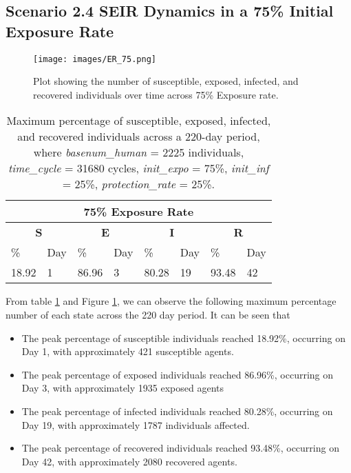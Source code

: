 \subsection{ Scenario 2.4 SEIR Dynamics in a 75\% Initial Exposure Rate}
\begin{figure}[H]
	\centering
	\texttt{[image: images/ER\_75.png]}
	\caption{Plot showing the number of susceptible, exposed, infected, and recovered individuals over time across 75\% Exposure rate. }
	\label{fig:20} 
\end{figure}
\begin{table} [H]
	\centering
	\begin{tabular}{|l|l|l|l|l|l|l|l|}
		\hline
		\multicolumn{8}{|c|}{\textbf{75\% Exposure Rate}}\\
		\hline
		\multicolumn{2}{|c|}{\textbf{S}} &  \multicolumn{2}{|c|}{\textbf{E}}&  \multicolumn{2}{|c|}{\textbf{I}}&  \multicolumn{2}{|c|}{\textbf{R}}\\
		\hline
		\%& Day & \% & Day & \%  & Day & \% & Day \\
		\hline
		18.92& 1 &86.96& 3&  80.28& 19& 93.48&42\\
		\hline
	\end{tabular}
	\caption{Maximum percentage of susceptible, exposed, infected, and recovered individuals across a 220-day period, where \textit{basenum\_human} = 2225 individuals, \textit{time\_cycle} = 31680 cycles, \textit{init\_expo} = 75\%, \textit{init\_inf} = 25\%,  \textit{protection\_rate} = 25\%.}
	\label{ER4_Max}
\end{table}
From table \ref{ER4_Max} and Figure \ref{fig:20}, we can observe the following maximum percentage number of each state across the 220 day period. It can be seen that 

\begin{itemize}
	
	\item The peak percentage of susceptible individuals reached 18.92\%, occurring on Day 1, with approximately 421 susceptible agents.
	\item The peak percentage of exposed individuals reached 86.96\%, occurring on Day 3, with approximately 1935 exposed agents
	\item The peak percentage of infected individuals reached 80.28\%, occurring on Day 19, with approximately 1787 individuals affected.
	\item The peak percentage of recovered individuals reached 93.48\%, occurring on Day 42, with approximately 2080 recovered agents. 
\end{itemize}

